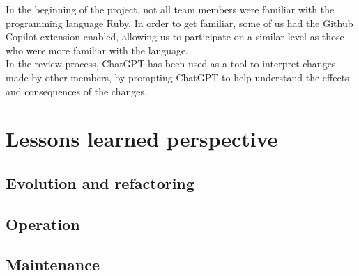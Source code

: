 \documentclass{article}
\begin{document}
In the beginning of the project, not all team members were familiar with the programming language Ruby. In order to get familiar, some of us had the Github Copilot extension enabled, allowing us to participate on a similar level as those who were more familiar with the language.\\

In the review process, ChatGPT has been used as a tool to interpret changes made by other members, by prompting ChatGPT to help understand the effects and consequences of the changes.\\

\section{Lessons learned perspective}

\subsection{Evolution and refactoring}

\subsection{Operation}

\subsection{Maintenance}
\end{document}
